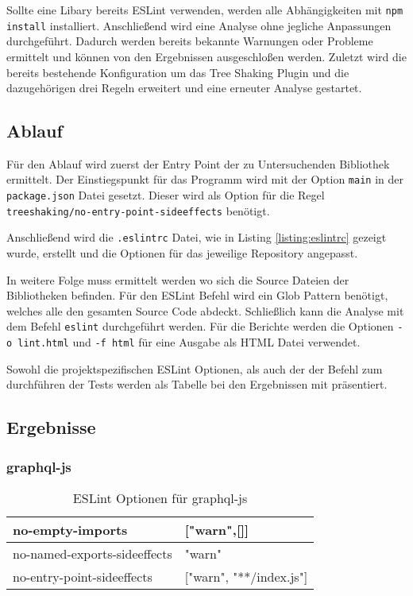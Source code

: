 Sollte eine Libary bereits ESLint verwenden, werden alle Abhängigkeiten mit \lstinline{npm install} installiert. Anschließend wird eine Analyse ohne jegliche Anpassungen durchgeführt. Dadurch werden bereits bekannte Warnungen oder Probleme ermittelt und können von den Ergebnissen ausgeschloßen werden. Zuletzt  wird die bereits bestehende Konfiguration um das Tree Shaking Plugin und die dazugehörigen drei Regeln erweitert und eine erneuter Analyse gestartet.

\subsection{Ablauf}

Für den Ablauf wird zuerst der Entry Point der zu Untersuchenden Bibliothek ermittelt. Der Einstiegspunkt für das Programm wird mit der Option \lstinline{main} in der \lstinline{package.json} Datei gesetzt. Dieser wird als Option für die Regel \lstinline{treeshaking/no-entry-point-sideeffects} benötigt.

Anschließend wird die \lstinline{.eslintrc} Datei, wie in Listing \ref{listing:eslintrc} gezeigt wurde, erstellt und die Optionen für das jeweilige Repository angepasst.

In weitere Folge muss ermittelt werden wo sich die Source Dateien der Bibliotheken befinden. Für den ESLint Befehl wird ein Glob Pattern benötigt, welches alle den gesamten Source Code abdeckt. Schließlich kann die Analyse mit dem Befehl \lstinline{eslint} durchgeführt werden. Für die Berichte werden die Optionen \lstinline{-o lint.html} und \lstinline{-f html} für eine Ausgabe als HTML Datei verwendet.

Sowohl die projektspezifischen ESLint Optionen, als auch der der Befehl zum durchführen der Tests werden als Tabelle bei den Ergebnissen mit präsentiert. 

\subsection{Ergebnisse}

\subsubsection{graphql-js}
\begin{table}[H]
\centering
\caption{ESLint Optionen für graphql-js}
\label{tbl:graphql-js-options}
\begin{tabular}{|l|l|}
\hline
no-empty-imports             & {[}"warn",{[}{]}{]}         \\ \hline
no-named-exports-sideeffects & "warn"                      \\ \hline
no-entry-point-sideeffects   & {[}"warn", "**/index.js"{]} \\ \hline
\end{tabular}
\end{table}

